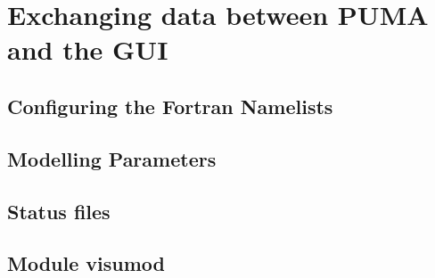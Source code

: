 \chapter{Exchanging data between PUMA and the GUI}
\label{sec:exchange}

\section{Configuring the Fortran Namelists}
\label{sec:konfig}
\section{Modelling Parameters }
\label{sec:model}

\section{Status files}
\label{sec:status}

\section{Module visumod}
\label{sec:visumod}


